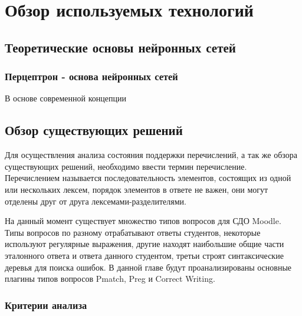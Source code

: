 \documentclass[a4paper,english,russian]{G2-105}
\begin{document}
\chapter{Обзор используемых технологий}

\section{Теоретические основы нейронных сетей}

\subsection{Перцептрон - основа нейронных сетей}

\par В основе современной концепции 
\section{Обзор существующих решений}

\par Для осуществления анализа состояния поддержки перечислений, а так же обзора существующих решений, необходимо ввести термин перечисление. Перечислением называется последовательность элементов, состоящих из одной или нескольких лексем, порядок элементов в ответе не важен, они могут отделены друг от друга лексемами-разделителями.
\par На данный момент существует множество типов вопросов для СДО Moodle. Типы вопросов по разному отрабатывают ответы студентов, некоторые используют регулярные выражения, другие находят наибольшие общие части эталонного ответа и ответа данного студентом, третьи строят синтаксические деревья для поиска ошибок. В данной главе будут проанализированы основные плагины типов вопросов Pmatch, Preg и Correct Writing.

\subsection{Критерии анализа}
\end{document}
